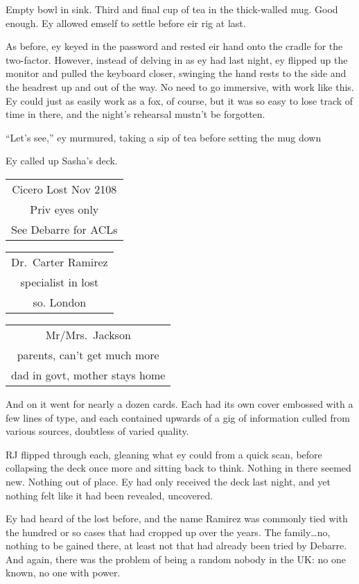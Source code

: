 Empty bowl in sink. Third and final cup of tea in the thick-walled mug. Good enough. Ey allowed emself to settle before eir rig at last.

As before, ey keyed in the password and rested eir hand onto the cradle for the two-factor. However, instead of delving in as ey had last night, ey flipped up the monitor and pulled the keyboard closer, swinging the hand rests to the side and the headrest up and out of the way. No need to go immersive, with work like this. Ey could just as easily work as a fox, of course, but it was so easy to lose track of time in there, and the night's rehearsal mustn't be forgotten.

``Let's see,'' ey murmured, taking a sip of tea before setting the mug down

Ey called up Sasha's deck.

\begin{longtable}[]{@{}c@{}}
\toprule
\endhead
Cicero Lost Nov 2108\tabularnewline
Priv eyes only\tabularnewline
See Debarre for ACLs\tabularnewline
\bottomrule
\end{longtable}

\begin{longtable}[]{@{}c@{}}
\toprule
\endhead
Dr.~Carter Ramirez\tabularnewline
specialist in lost\tabularnewline
so. London\tabularnewline
\bottomrule
\end{longtable}

\begin{longtable}[]{@{}c@{}}
\toprule
\endhead
Mr/Mrs.~Jackson\tabularnewline
parents, can't get much more\tabularnewline
dad in govt, mother stays home\tabularnewline
\bottomrule
\end{longtable}

And on it went for nearly a dozen cards. Each had its own cover embossed with a few lines of type, and each contained upwards of a gig of information culled from various sources, doubtless of varied quality.

RJ flipped through each, gleaning what ey could from a quick scan, before collapsing the deck once more and sitting back to think. Nothing in there seemed new. Nothing out of place. Ey had only received the deck last night, and yet nothing felt like it had been revealed, uncovered.

Ey had heard of the lost before, and the name Ramirez was commonly tied with the hundred or so cases that had cropped up over the years. The family\ldots{}no, nothing to be gained there, at least not that had already been tried by Debarre. And again, there was the problem of being a random nobody in the UK: no one known, no one with power.


